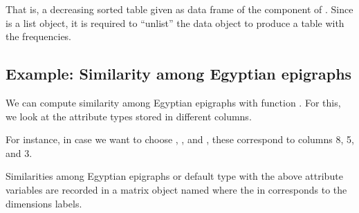 \documentclass[a4paper,12pt,english]{sphinxhowto}
\begin{document}
That is, a decreasing sorted table given as data frame of the 
component of . Since  is a list object, it is required to “unlist” the
data object to produce a table with the frequencies.



\subsection{Example: Similarity among Egyptian epigraphs}
\label{\detokenize{EpigraphicNetwork:example-similarity-among-egyptian-epigraphs}}
We can compute similarity among Egyptian epigraphs with function .
For this, we look at the attribute types stored in different columns.

\begin{sphinxVerbatim}[commandchars=\\\{\},formatcom=\footnotesize]
 
\end{sphinxVerbatim}


For instance, in case we want to choose , , and ,
these correspond to columns 8, 5, and 3.

Similarities among Egyptian epigraphs  or default type  with the above attribute variables are recorded in
a matrix object named  where the  in  corresponds to the dimensions labels.
\end{document}
